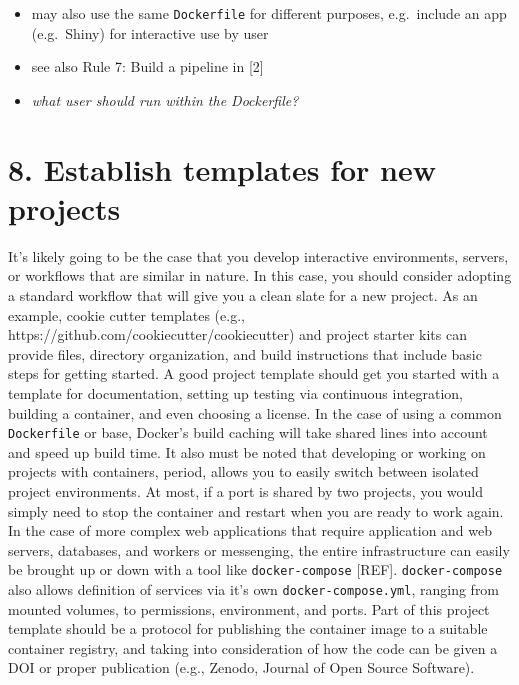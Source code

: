 \documentclass[10pt,letterpaper]{article}
\providecommand{\tightlist}{%
  \setlength{\itemsep}{0pt}\setlength{\parskip}{0pt}}
\begin{document}
\begin{itemize}
\tightlist
\item
  may also use the same \texttt{Dockerfile} for different purposes,
  e.g.~include an app (e.g.~Shiny) for interactive use by user
\item
  see also Rule 7: Build a pipeline in {[}2{]}
\item
  \emph{what user should run within the Dockerfile?} 
\end{itemize}

\hypertarget{establish-templates-for-new-projects}{%
\section{8. Establish templates for new
projects}\label{establish-templates-for-new-projects}}

It's likely going to be the case that you develop interactive
environments, servers, or workflows that are similar in nature. In this
case, you should consider adopting a standard workflow that will give
you a clean slate for a new project. As an example, cookie cutter
templates (e.g., https://github.com/cookiecutter/cookiecutter) and
project starter kits can provide files, directory organization, and
build instructions that include basic steps for getting started. A good
project template should get you started with a template for
documentation, setting up testing via continuous integration, building a
container, and even choosing a license. In the case of using a common
\texttt{Dockerfile} or base, Docker's build caching will take shared
lines into account and speed up build time. It also must be noted that
developing or working on projects with containers, period, allows you to
easily switch between isolated project environments. At most, if a port
is shared by two projects, you would simply need to stop the container
and restart when you are ready to work again. In the case of more
complex web applications that require application and web servers,
databases, and workers or messenging, the entire infrastructure can
easily be brought up or down with a tool like \texttt{docker-compose}
{[}REF{]}. \texttt{docker-compose} also allows definition of services
via it's own \texttt{docker-compose.yml}, ranging from mounted volumes,
to permissions, environment, and ports. Part of this project template
should be a protocol for publishing the container image to a suitable
container registry, and taking into consideration of how the code can be
given a DOI or proper publication (e.g., Zenodo, Journal of Open Source
Software).
\end{document}
